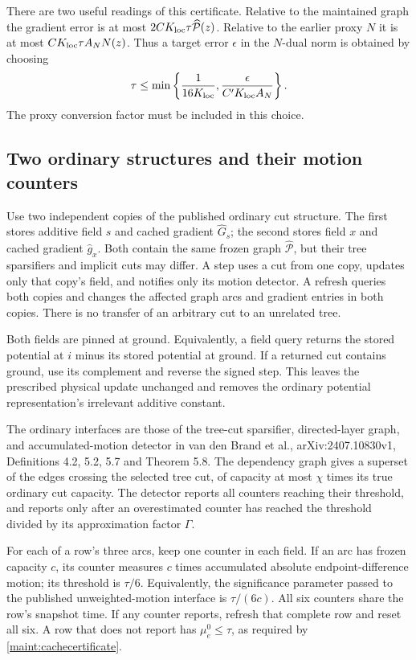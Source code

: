 \documentclass[11pt]{article}
\theoremstyle{definition}\newtheorem{definition}[theorem]{Definition}
\theoremstyle{remark}\newtheorem{remark}[theorem]{Remark}
\begin{document}
There are two useful readings of this certificate. Relative to the
maintained graph the gradient error is at most
$2C K_{\rm loc}\tau\widehat{\mathcal P}(z)$. Relative to the earlier
proxy $N$ it is at most $C K_{\rm loc}\tau A_NN(z)$. Thus a target
error $\epsilon$ in the $N$-dual norm is obtained by choosing
\begin{equation}
 \tau\leq\min\left\{\frac1{16K_{\rm loc}},
              \frac{\epsilon}{C'K_{\rm loc}A_N}\right\}.
 \label{maint:threshold}
\end{equation}
The proxy conversion factor must be included in this choice.

\subsection{Two ordinary structures and their motion counters}

Use two independent copies of the published ordinary cut structure.
The first stores additive field $s$ and cached gradient $\widehat G_s$;
the second stores field $x$ and cached gradient $\widehat g_x$. Both
contain the same frozen graph $\widehat{\mathcal P}$, but their tree
sparsifiers and implicit cuts may differ. A step uses a cut from one
copy, updates only that copy's field, and notifies only its motion
detector. A refresh queries both copies and changes the affected graph
arcs and gradient entries in both copies. There is no transfer of an
arbitrary cut to an unrelated tree.

Both fields are pinned at ground. Equivalently, a field query returns
the stored potential at $i$ minus its stored potential at ground. If a
returned cut contains ground, use its complement and reverse the signed
step. This leaves the prescribed physical update unchanged and removes
the ordinary potential representation's irrelevant additive constant.

The ordinary interfaces are those of the tree-cut sparsifier,
directed-layer graph, and accumulated-motion detector in
van den Brand et al., arXiv:2407.10830v1, Definitions 4.2, 5.2, 5.7 and
Theorem 5.8. The dependency graph gives a superset of the edges crossing
the selected tree cut, of capacity at most $\chi$ times its true
ordinary cut capacity. The detector reports all counters reaching their
threshold, and reports only after an overestimated counter has reached
the threshold divided by its approximation factor $\Gamma$.

For each of a row's three arcs, keep one counter in each field. If an
arc has frozen capacity $c$, its counter measures $c$ times accumulated
absolute endpoint-difference motion; its threshold is $\tau/6$.
Equivalently, the significance parameter passed to the published
unweighted-motion interface is $\tau/(6c)$. All six counters share the
row's snapshot time. If any counter reports, refresh that complete row
and reset all six. A row that does not report has $\mu_e^0\leq\tau$,
as required by \eqref{maint:cachecertificate}.
\end{document}
